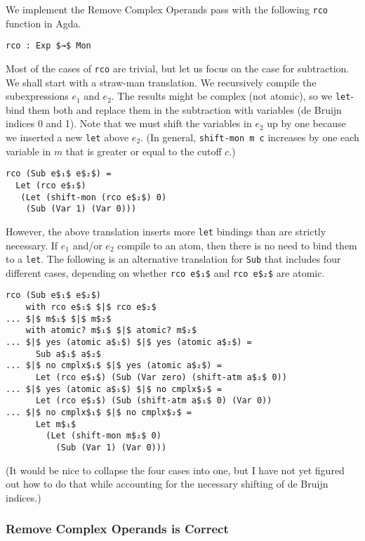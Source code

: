 \documentclass[sigplan,review,dvipsnames,screen,10pt]{acmart}
\begin{document}
We implement the Remove Complex Operands pass with the following
\lstinline{rco} function in Agda.
\begin{lstlisting}
rco : Exp $→$ Mon
\end{lstlisting}

Most of the cases of \lstinline{rco} are trivial, but let us focus on
the case for subtraction. We shall start with a straw-man
translation. We recursively compile the subexpressions $e_1$ and
$e_2$. The results might be complex (not atomic), so we
\lstinline{let}-bind them both and replace them in the subtraction
with variables (de Bruijn indices 0 and 1). Note that we must shift
the variables in $e_2$ up by one because we inserted a new
\lstinline{let} above $e_2$. (In general, \lstinline{shift-mon m c}
increases by one each variable in $m$ that is greater or equal to the
cutoff $c$.)

\begin{lstlisting}
rco (Sub e$₁$ e$₂$) =
  Let (rco e$₁$)
   (Let (shift-mon (rco e$₂$) 0)
    (Sub (Var 1) (Var 0)))
\end{lstlisting}

However, the above translation inserts more \lstinline{let} bindings
than are strictly necessary. If $e_1$ and/or $e_2$ compile to an atom,
then there is no need to bind them to a \lstinline{let}.  The
following is an alternative translation for \lstinline{Sub} that
includes four different cases, depending on whether \lstinline{rco e$₁$}
and \lstinline{rco e$₂$} are atomic.

\begin{lstlisting}
rco (Sub e$₁$ e$₂$)
    with rco e$₁$ $|$ rco e$₂$
... $|$ m$₁$ $|$ m$₂$
    with atomic? m$₁$ $|$ atomic? m$₂$
... $|$ yes (atomic a$₁$) $|$ yes (atomic a$₂$) =
      Sub a$₁$ a$₂$
... $|$ no cmplx$₁$ $|$ yes (atomic a$₂$) =
      Let (rco e$₁$) (Sub (Var zero) (shift-atm a$₂$ 0))
... $|$ yes (atomic a$₁$) $|$ no cmplx$₂$ =
      Let (rco e$₂$) (Sub (shift-atm a$₁$ 0) (Var 0))
... $|$ no cmplx$₁$ $|$ no cmplx$₂$ = 
      Let m$₁$
        (Let (shift-mon m$₂$ 0)
          (Sub (Var 1) (Var 0)))
\end{lstlisting}

(It would be nice to collapse the four cases into one, but I have not
yet figured out how to do that while accounting for the necessary
shifting of de Bruijn indices.)

\subsubsection{Remove Complex Operands is Correct}
\end{document}
